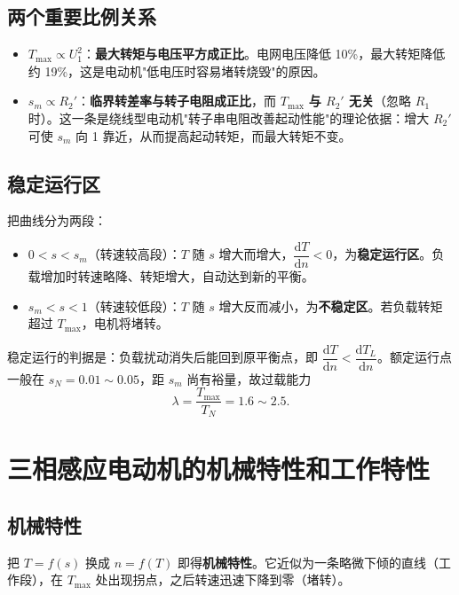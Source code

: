 
\subsection{两个重要比例关系}
\begin{itemize}
  \item $T_{\max}\propto U_1^{2}$：\textbf{最大转矩与电压平方成正比}。电网电压降低 10\%，最大转矩降低约 19\%，这是电动机"低电压时容易堵转烧毁"的原因。
  \item $s_m\propto R_2'$：\textbf{临界转差率与转子电阻成正比}，而 $T_{\max}$ \textbf{与 $R_2'$ 无关}（忽略 $R_1$ 时）。这一条是绕线型电动机"转子串电阻改善起动性能"的理论依据：增大 $R_2'$ 可使 $s_m$ 向 1 靠近，从而提高起动转矩，而最大转矩不变。
\end{itemize}

\subsection{稳定运行区}
把曲线分为两段：
\begin{itemize}
  \item $0<s<s_m$（转速较高段）：$T$ 随 $s$ 增大而增大，$\dfrac{\mathrm{d}T}{\mathrm{d}n}<0$，为\textbf{稳定运行区}。负载增加时转速略降、转矩增大，自动达到新的平衡。
  \item $s_m<s<1$（转速较低段）：$T$ 随 $s$ 增大反而减小，为\textbf{不稳定区}。若负载转矩超过 $T_{\max}$，电机将堵转。
\end{itemize}
稳定运行的判据是：负载扰动消失后能回到原平衡点，即 $\dfrac{\mathrm{d}T}{\mathrm{d}n}<\dfrac{\mathrm{d}T_L}{\mathrm{d}n}$。额定运行点一般在 $s_N=0.01\sim0.05$，距 $s_m$ 尚有裕量，故过载能力
\begin{equation}
\lambda=\frac{T_{\max}}{T_N}=1.6\sim2.5 .
\end{equation}

\section{三相感应电动机的机械特性和工作特性}

\subsection{机械特性}
把 $T=f(s)$ 换成 $n=f(T)$ 即得\textbf{机械特性}。它近似为一条略微下倾的直线（工作段），在 $T_{\max}$ 处出现拐点，之后转速迅速下降到零（堵转）。

